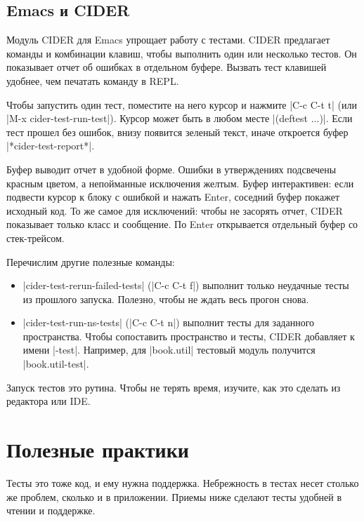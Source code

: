 \subsection{Emacs и CIDER}

Модуль CIDER для Emacs упрощает
работу с тестами. CIDER предлагает команды и комбинации клавиш, чтобы выполнить
один или несколько тестов. Он показывает отчет об ошибках в отдельном
буфере. Вызвать тест клавишей удобнее, чем печатать команду в REPL.

Чтобы запустить один тест, поместите на него курсор и нажмите \spverb|C-c C-t t|
(или \spverb|M-x cider-test-run-test|). Курсор может быть в любом месте
\spverb|(deftest ...)|. Если тест прошел без ошибок, внизу появится зеленый
текст, иначе откроется буфер \spverb|*cider-test-report*|.

Буфер выводит отчет в удобной форме. Ошибки в утверждениях подсвечены красным
цветом, а непойманные исключения желтым. Буфер интерактивен: если подвести
курсор к блоку с ошибкой и нажать Enter, соседний буфер покажет исходный код. То
же самое для исключений: чтобы не засорять отчет, CIDER показывает только класс
и сообщение. По Enter открывается отдельный буфер со стек-трейсом.

Перечислим другие полезные команды:

\begin{itemize}

\item
  \spverb|cider-test-rerun-failed-tests| (\spverb|C-c C-t f|) выполнит только
  неудачные тесты из прошлого запуска. Полезно, чтобы не ждать весь прогон
  снова.

\item
  \spverb|cider-test-run-ns-tests| (\spverb|C-c C-t n|) выполнит тесты для
  заданного пространства. Чтобы сопоставить пространство и тесты, CIDER
  добавляет к имени \spverb|-test|. Например, для \spverb|book.util| тестовый
  модуль получится \spverb|book.util-test|.

\end{itemize}

Запуск тестов это рутина. Чтобы не терять время, изучите, как это сделать из
редактора или IDE.

\section{Полезные практики}

Тесты это тоже код, и ему нужна поддержка. Небрежность в тестах несет столько же
проблем, сколько и в приложении. Приемы ниже сделают тесты удобней в чтении и
поддержке.

